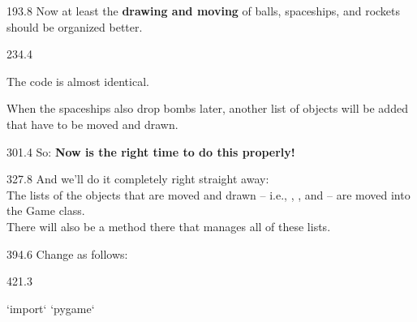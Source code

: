 \documentclass{aslab}
\newcommand*\Mg[1]{\textcolor{codemagenta}{#1}} %
\newcommand*\Bl[1]{\textcolor{aslabblue}{#1}}   %
\begin{document}
\begin{region}[pitch=13.3]{193.8}
Now at least the \textbf{drawing and moving} of balls, spaceships, and
rockets should be organized better.
\end{region}

\begin{region}[pitch=13.23]{234.4}
\begin{boldsteps}
\item The code is almost identical.
\item When the spaceships also drop bombs later, another list of objects
  will be added that have to be moved and drawn.
\end{boldsteps}
\end{region}

\begin{region}{301.4}
So: \textbf{Now is the right time to do this properly!}
\end{region}

\begin{region}[pitch=13.37]{327.8}
And we'll do it completely right straight away:\\
The lists of the objects that are moved and drawn -- i.e., ,
, and  -- are moved into the Game class.\\
There will also be a method  there that manages all of these
lists.
\end{region}

\begin{region}{394.6}
Change  as follows:
\end{region}

\begin{region}{421.3}
\begin{codeblock}[escapechar=`]
`\Mg{import}` `\Bl{pygame}`
\end{codeblock}
\end{region}
\end{document}
